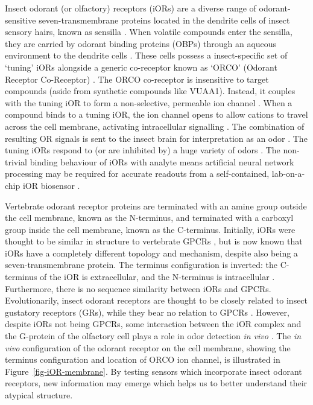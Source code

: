 \documentclass[
  a4paper,
]{scrbook}
\begin{document}
Insect odorant (or olfactory) receptors (iORs) are a diverse range of
odorant-sensitive seven-transmembrane proteins located in the dendrite
cells of insect sensory hairs, known as sensilla
\autocite{Clyne1999,Carraher2015,Brito2016,Wicher2021}. When volatile
compounds enter the sensilla, they are carried by odorant binding
proteins (OBPs) through an aqueous environment to the dendrite cells
\autocite{Carraher2015,Brito2016,Wicher2021}. These cells possess a
insect-specific set of `tuning' iORs alongside a generic co-receptor
known as `ORCO' (Odorant Receptor Co-Receptor)
\autocite{Carraher2015,Butterwick2018,Khadka2019,Wicher2021}. The ORCO
co-receptor is insensitive to target compounds (aside from synthetic
compounds like VUAA1). Instead, it couples with the tuning iOR to form a
non-selective, permeable ion channel
\autocite{Butterwick2018,Wicher2021}. When a compound binds to a tuning
iOR, the ion channel opens to allow cations to travel across the cell
membrane, activating intracellular signalling
\autocite{Smart2008,Wicher2008,Sato2008,Carraher2015,Brito2016,Butterwick2018,Wicher2021}.
The combination of resulting OR signals is sent to the insect brain for
interpretation as an odor \autocite{Hallem2004,Carraher2015,Wicher2021}.
The tuning iORs respond to (or are inhibited by) a huge variety of odors
\autocite{Munch2016}. The non-trivial binding behaviour of iORs with
analyte means artificial neural network processing may be required for
accurate readouts from a self-contained, lab-on-a-chip iOR biosensor
\autocite{Bachtiar2016}.

Vertebrate odorant receptor proteins are terminated with an amine group
outside the cell membrane, known as the N-terminus, and terminated with
a carboxyl group inside the cell membrane, known as the C-terminus.
Initially, iORs were thought to be similar in structure to vertebrate
GPCRs \autocite{Clyne1999}, but is now known that iORs have a completely
different topology and mechanism, despite also being a
seven-transmembrane protein. The terminus configuration is inverted: the
C-terminus of the iOR is extracellular, and the N-terminus is
intracellular
\autocite{Smart2008,Glatz2011,Carraher2015,Brito2016,Wicher2021}.
Furthermore, there is no sequence similarity between iORs and GPCRs.
Evolutionarily, insect odorant receptors are thought to be closely
related to insect gustatory receptors (GRs), while they bear no relation
to GPCRs \autocite{Glatz2011,Carraher2015,Wicher2021}. However, despite
iORs not being GPCRs, some interaction between the iOR complex and the
G-protein of the olfactory cell plays a role in odor detection \emph{in
vivo} \autocite{Wicher2008,Wicher2021}. The \emph{in vivo} configuration
of the odorant receptor on the cell membrane, showing the terminus
configuration and location of ORCO ion channel, is illustrated in
Figure~\ref{fig-iOR-membrane}. By testing sensors which incorporate
insect odorant receptors, new information may emerge which helps us to
better understand their atypical structure.
\end{document}
